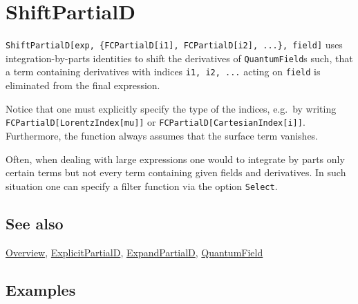 \documentclass[../FeynCalcManual.tex]{subfiles}
\begin{document}
\begin{Shaded}
\begin{Highlighting}[]
 
\end{Highlighting}
\end{Shaded}

\hypertarget{shiftpartiald}{
\section{ShiftPartialD}\label{shiftpartiald}}

\texttt{ShiftPartialD[\allowbreak{}exp,\ \allowbreak{}\{\allowbreak{}FCPartialD[\allowbreak{}i1],\ \allowbreak{}FCPartialD[\allowbreak{}i2],\ \allowbreak{}...\},\ \allowbreak{}field]}
uses integration-by-parts identities to shift the derivatives of
\texttt{QuantumField}s such, that a term containing derivatives with
indices \texttt{i1,\ \allowbreak{}i2,\ \allowbreak{}...} acting on
\texttt{field} is eliminated from the final expression.

Notice that one must explicitly specify the type of the indices, e.g.~by
writing \texttt{FCPartialD[\allowbreak{}LorentzIndex[\allowbreak{}mu]]}
or \texttt{FCPartialD[\allowbreak{}CartesianIndex[\allowbreak{}i]]}.
Furthermore, the function always assumes that the surface term vanishes.

Often, when dealing with large expressions one would to integrate by
parts only certain terms but not every term containing given fields and
derivatives. In such situation one can specify a filter function via the
option \texttt{Select}.

\subsection{See also}

\hyperlink{toc}{Overview},
\hyperlink{explicitpartiald}{ExplicitPartialD},
\hyperlink{expandpartiald}{ExpandPartialD},
\hyperlink{quantumfield}{QuantumField}

\subsection{Examples}

\begin{Shaded}
\begin{Highlighting}[]
\ExtensionTok{=}\OperatorTok{[}\OperatorTok{,}\OperatorTok{[}\OperatorTok{]]}\OperatorTok{[}\OperatorTok{[} 
    \OperatorTok{]]}\OperatorTok{[}\SpecialCharTok{\textbackslash{}}\OperatorTok{[}\OperatorTok{]]}\OperatorTok{[}\OperatorTok{[}\OperatorTok{]]}\OperatorTok{[}\OperatorTok{,}\OperatorTok{[}\OperatorTok{]]}
\end{Highlighting}
\end{Shaded}
\end{document}
